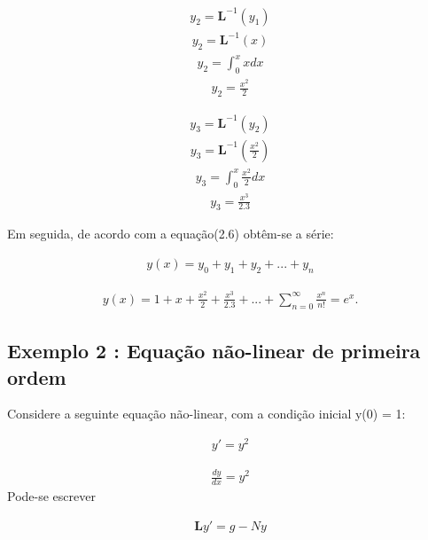 \begin{gather*}
  y_{2} = \textbf{L}^{-1} (y_{1})
\end{gather*}
\begin{gather*}
  y_{2} = \textbf{L}^{-1}(x)
\end{gather*}
\begin{gather*}
  y_{2} =\int_0^{x} xdx
\end{gather*}
\begin{gather*}
  y_{2} = \frac{x^{2}}{2}
\end{gather*}



\begin{gather*}
  y_{3} = \textbf{L}^{-1} (y_{2})
\end{gather*}
\begin{gather*}
  y_{3} = \textbf{L}^{-1}\left(\frac{x^{2}}{2}\right)
\end{gather*}
\begin{gather*}
  y_{3} =\int_0^{x}\frac{x^{2}}{2}dx
\end{gather*}
\begin{gather*}
  y_{3} = \frac{x^{3}}{2.3}
\end{gather*}


Em seguida, de acordo com  a equação(2.6) obtêm-se a série:

\begin{gather*}
  y(x) = y_{0} +y_{1} + y_{2} + ... + y_{n} 
\end{gather*}

\begin{gather*}
  y(x) = 1 + x + \frac{x^{2}}{2} +  \frac{x^{3}}{2.3} + ...+ \sum_{n=0}^{\infty}\frac{x^{n}}{n!} = e^{x}.
\end{gather*}

\subsection{Exemplo 2 : Equação não-linear de primeira ordem}


Considere a seguinte equação não-linear, com a condição inicial y(0) = 1:

\begin{gather*}
  y' = y^{2}
\end{gather*}

\begin{gather*}
 \frac{d y}{d x} = y^2
 \end{gather*}
Pode-se escrever

\begin{gather*}
 \textbf{L}y' = g - Ny
  \end{gather*}
  
